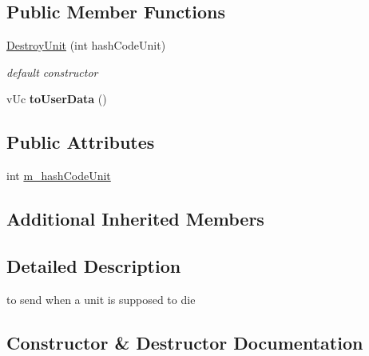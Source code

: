 \subsection*{Public Member Functions}
\begin{DoxyCompactItemize}
\item 
\hyperlink{class_network_1_1_messages_1_1_destroy_unit_a50c8c7a81b88fa2e71dc96e2365a7b8c}{Destroy\+Unit} (int hash\+Code\+Unit)
\begin{DoxyCompactList}\small\item\em default constructor \end{DoxyCompactList}\item 
\mbox{\label{class_network_1_1_messages_1_1_destroy_unit_ab47755009497e4090217296940940ef6}} 
v\+Uc {\bfseries to\+User\+Data} ()
\end{DoxyCompactItemize}
\subsection*{Public Attributes}
\begin{DoxyCompactItemize}
\item 
int \hyperlink{class_network_1_1_messages_1_1_destroy_unit_a7453e48d54114f52ce66918f88cc376c}{m\+\_\+hash\+Code\+Unit}
\end{DoxyCompactItemize}
\subsection*{Additional Inherited Members}


\subsection{Detailed Description}
to send when a unit is supposed to die 

\subsection{Constructor \& Destructor Documentation}
\mbox{\label{class_network_1_1_messages_1_1_destroy_unit_a50c8c7a81b88fa2e71dc96e2365a7b8c}} 
